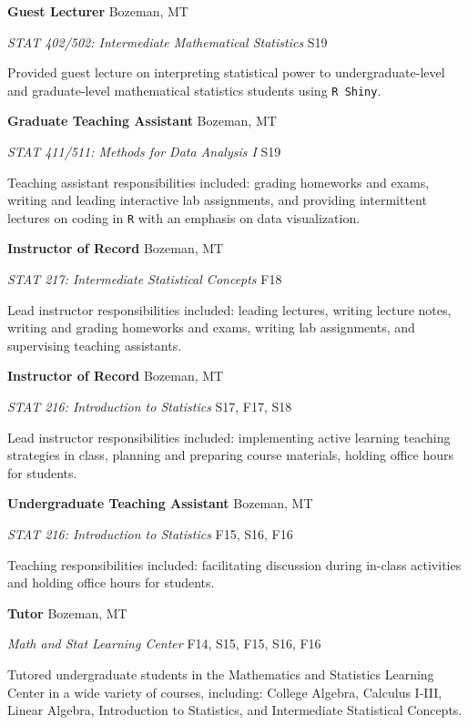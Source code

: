 \documentclass[a4paper]{article}
\begin{document}
\textbf{Guest Lecturer} \hfill Bozeman, MT

\emph{STAT 402/502: Intermediate Mathematical Statistics} \hfill S19

Provided guest lecture on interpreting statistical power to
undergraduate-level and graduate-level mathematical statistics students
using \texttt{R\ Shiny}. \vspace*{2mm}

\textbf{Graduate Teaching Assistant} \hfill Bozeman, MT

\emph{STAT 411/511: Methods for Data Analysis I} \hfill S19

Teaching assistant responsibilities included: grading homeworks and
exams, writing and leading interactive lab assignments, and providing
intermittent lectures on coding in \texttt{R} with an emphasis on data
visualization. \vspace*{2mm}

\textbf{Instructor of Record} \hfill Bozeman, MT

\emph{STAT 217: Intermediate Statistical Concepts} \hfill F18

Lead instructor responsibilities included: leading lectures, writing
lecture notes, writing and grading homeworks and exams, writing lab
assignments, and supervising teaching assistants. \vspace*{2mm}

\textbf{Instructor of Record} \hfill Bozeman, MT

\emph{STAT 216: Introduction to Statistics} \hfill S17, F17, S18

Lead instructor responsibilities included: implementing active learning
teaching strategies in class, planning and preparing course materials,
holding office hours for students. \vspace*{2mm}

\textbf{Undergraduate Teaching Assistant} \hfill Bozeman, MT

\emph{STAT 216: Introduction to Statistics} \hfill F15, S16, F16

Teaching responsibilities included: facilitating discussion during
in-class activities and holding office hours for students. \vspace*{2mm}

\textbf{Tutor} \hfill Bozeman, MT

\emph{Math and Stat Learning Center} \hfill F14, S15, F15, S16, F16

Tutored undergraduate students in the Mathematics and Statistics
Learning Center in a wide variety of courses, including: College
Algebra, Calculus I-III, Linear Algebra, Introduction to Statistics, and
Intermediate Statistical Concepts.\vspace*{2mm}
\end{document}
